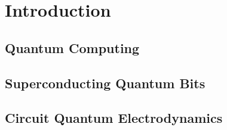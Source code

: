 \chapter{Introduction}


\section{Quantum Computing}


\section{Superconducting Quantum Bits}


\section{Circuit Quantum Electrodynamics}

